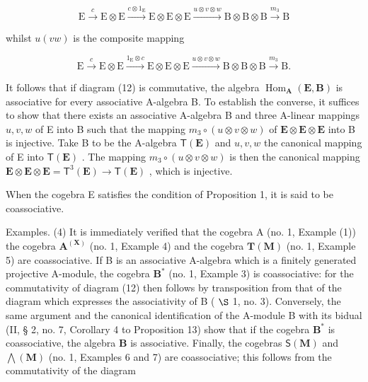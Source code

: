 \[
\mathrm{E} \xrightarrow {c} \mathrm{E} \otimes \mathrm{E} \xrightarrow {c \otimes 1 _ {\mathrm{E}}} \mathrm{E} \otimes \mathrm{E} \otimes \mathrm{E} \xrightarrow {u \otimes v \otimes w} \mathrm{B} \otimes \mathrm{B} \otimes \mathrm{B} \xrightarrow {m _ {3}} \mathrm{B}
\]

whilst \(u(vw)\) is the composite mapping

\[
\mathrm{E} \xrightarrow {c} \mathrm{E} \otimes \mathrm{E} \xrightarrow {1 _ {\mathrm{E}} \otimes c} \mathrm{E} \otimes \mathrm{E} \otimes \mathrm{E} \xrightarrow {u \otimes v \otimes w} \mathrm{B} \otimes \mathrm{B} \otimes \mathrm{B} \xrightarrow {m _ {3}} \mathrm{B}.
\]

It follows that if diagram (12) is commutative, the algebra \(\operatorname{Hom}_{\mathbf{A}}(\mathbf{E}, \mathbf{B})\) is associative for every associative A-algebra B. To establish the converse, it suffices to show that there exists an associative A-algebra B and three A-linear mappings \(u, v, w\) of E into B such that the mapping \(m_3 \circ (u \otimes v \otimes w)\) of \(\mathbf{E} \otimes \mathbf{E} \otimes \mathbf{E}\) into B is injective. Take B to be the A-algebra \(\mathsf{T}(\mathbf{E})\) and \(u, v, w\) the canonical mapping of E into \(\mathsf{T}(\mathbf{E})\) . The mapping \(m_3 \circ (u \otimes v \otimes w)\) is then the canonical mapping \(\mathbf{E} \otimes \mathbf{E} \otimes \mathbf{E} = \mathsf{T}^3(\mathbf{E}) \to \mathsf{T}(\mathbf{E})\) , which is injective.

When the cogebra E satisfies the condition of Proposition 1, it is said to be coassociative.

Examples. (4) It is immediately verified that the cogebra A (no. 1, Example (1)) the cogebra \(\mathbf{A}^{(\mathbf{X})}\) (no. 1, Example 4) and the cogebra \(\mathbf{T}(\mathbf{M})\) (no. 1, Example 5) are coassociative. If B is an associative A-algebra which is a finitely generated projective A-module, the cogebra \(\mathbf{B}^*\) (no. 1, Example 3) is coassociative: for the commutativity of diagram (12) then follows by transposition from that of the diagram which expresses the associativity of B ( \(\S\) 1, no. 3). Conversely, the same argument and the canonical identification of the A-module B with its bidual (II, § 2, no. 7, Corollary 4 to Proposition 13) show that if the cogebra \(\mathbf{B}^*\) is coassociative, the algebra \(\mathbf{B}\) is associative. Finally, the cogebras \(\mathsf{S}(\mathbf{M})\) and \(\bigwedge (\mathbf{M})\) (no. 1, Examples 6 and 7) are coassociative; this follows from the commutativity of the diagram


